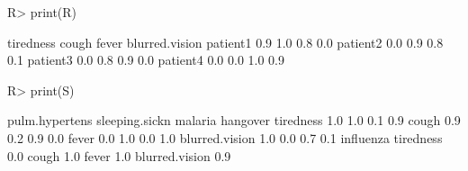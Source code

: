 \begin{Schunk}
% --begin: "comp.data"
\begin{Sinput}
R> print(R)
\end{Sinput}
\begin{Soutput}
         tiredness cough fever blurred.vision
patient1       0.9   1.0   0.8            0.0
patient2       0.0   0.9   0.8            0.1
patient3       0.0   0.8   0.9            0.0
patient4       0.0   0.0   1.0            0.9
\end{Soutput}
\begin{Sinput}
R> print(S)
\end{Sinput}
\begin{Soutput}
               pulm.hypertens sleeping.sickn malaria hangover
tiredness                 1.0            1.0     0.1      0.9
cough                     0.9            0.2     0.9      0.0
fever                     0.0            1.0     0.0      1.0
blurred.vision            1.0            0.0     0.7      0.1
               influenza
tiredness            0.0
cough                1.0
fever                1.0
blurred.vision       0.9
\end{Soutput}
%
% --end: "comp.data"
\end{Schunk}
